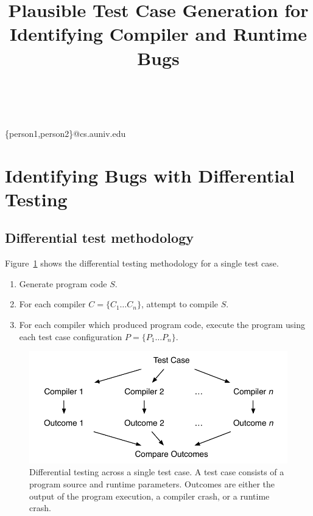 



\title{Plausible Test Case Generation for Identifying Compiler and Runtime Bugs}

%
%
{ \\
          \\
        }
{\{person1,person2\}@cs.auniv.edu}

\maketitle






\section{Identifying Bugs with Differential Testing}

\subsection{Differential test methodology}

Figure~\ref{fig:difftest} shows the differential testing methodology for a single test case.

\begin{enumerate}
	\item Generate program code $S$.
	\item For each compiler $C = \{C_1 \ldots C_n\}$, attempt to compile $S$.
	\item For each compiler which produced program code, execute the program using each test case configuration $P = \{P_1 \ldots P_n\}$.
\end{enumerate}

\begin{figure}
  \centering
  \includegraphics[width=.9\columnwidth]{img/difftest} %
  \caption{%
    Differential testing across a single test case. A test case consists of a program source and runtime parameters. Outcomes are either the output of the program execution, a compiler crash, or a runtime crash.%
  }%
  \label{fig:difftest}
\end{figure}



